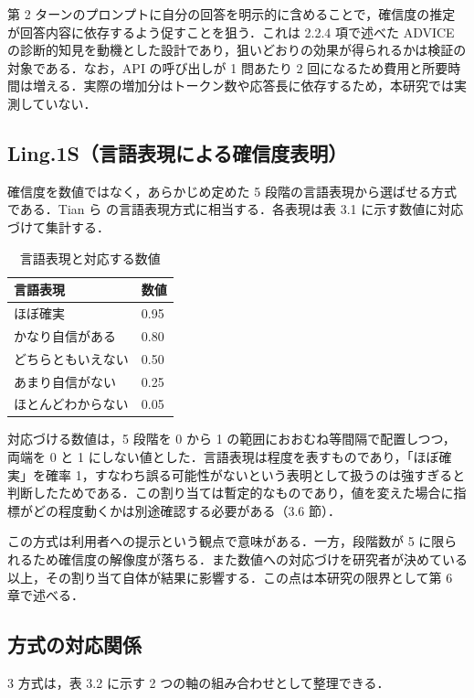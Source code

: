 第 2 ターンのプロンプトに自分の回答を明示的に含めることで，確信度の推定が回答内容に依存するよう促すことを狙う．これは 2.2.4 項で述べた ADVICE の診断的知見を動機とした設計であり，狙いどおりの効果が得られるかは検証の対象である．なお，API の呼び出しが 1 問あたり 2 回になるため費用と所要時間は増える．実際の増加分はトークン数や応答長に依存するため，本研究では実測していない．

\subsection{Ling.1S（言語表現による確信度表明）}

確信度を数値ではなく，あらかじめ定めた 5 段階の言語表現から選ばせる方式である．Tian ら \cite{tian2023justask} の言語表現方式に相当する．各表現は表 3.1 に示す数値に対応づけて集計する．

\begin{table}[htbp]
\centering
\small
\caption{言語表現と対応する数値}
\label{tab:3.1}
\begin{tabular}{|l|l|}
\hline
言語表現 & 数値 \\
\hline
ほぼ確実 & 0.95 \\
かなり自信がある & 0.80 \\
どちらともいえない & 0.50 \\
あまり自信がない & 0.25 \\
ほとんどわからない & 0.05 \\
\hline
\end{tabular}
\end{table}

対応づける数値は，5 段階を 0 から 1 の範囲におおむね等間隔で配置しつつ，両端を 0 と 1 にしない値とした．言語表現は程度を表すものであり，「ほぼ確実」を確率 1，すなわち誤る可能性がないという表明として扱うのは強すぎると判断したためである．この割り当ては暫定的なものであり，値を変えた場合に指標がどの程度動くかは別途確認する必要がある（3.6 節）．

この方式は利用者への提示という観点で意味がある．一方，段階数が 5 に限られるため確信度の解像度が落ちる．また数値への対応づけを研究者が決めている以上，その割り当て自体が結果に影響する．この点は本研究の限界として第 6 章で述べる．

\subsection{方式の対応関係}

3 方式は，表 3.2 に示す 2 つの軸の組み合わせとして整理できる．

